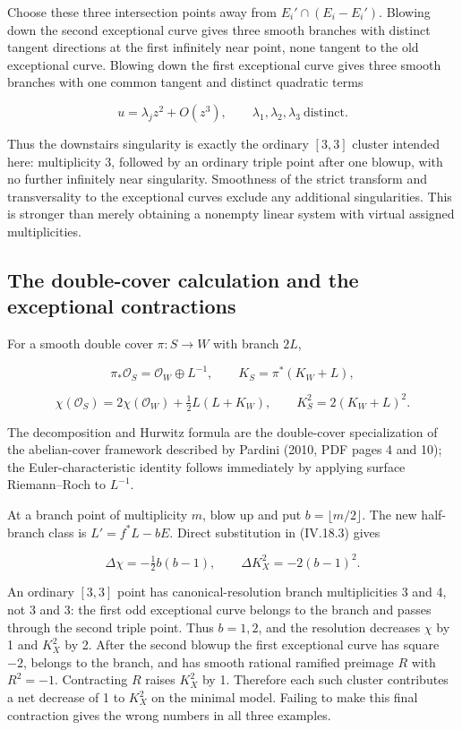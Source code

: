 Choose these three intersection points away from \(E_i'\cap(E_i-E_i')\). Blowing down the second exceptional curve gives three smooth branches with distinct tangent directions at the first infinitely near point, none tangent to the old exceptional curve. Blowing down the first exceptional curve gives three smooth branches with one common tangent and distinct quadratic terms

\[
u=\lambda_jz^2+O(z^3),\qquad \lambda_1,\lambda_2,\lambda_3\ \text{distinct}.
\]

Thus the downstairs singularity is exactly the ordinary \([3,3]\) cluster intended here: multiplicity 3, followed by an ordinary triple point after one blowup, with no further infinitely near singularity. Smoothness of the strict transform and transversality to the exceptional curves exclude any additional singularities. This is stronger than merely obtaining a nonempty linear system with virtual assigned multiplicities.

\subsection{The double-cover calculation and the exceptional contractions}

For a smooth double cover \(\pi:S\to W\) with branch \(2L\),

\[
\pi_*\mathcal O_S=\mathcal O_W\oplus L^{-1},\qquad
K_S=\pi^*(K_W+L),
\]

\[
\chi(\mathcal O_S)=2\chi(\mathcal O_W)+\tfrac12L(L+K_W),\qquad
K_S^2=2(K_W+L)^2.
\tag{IV.18.3}
\]

The decomposition and Hurwitz formula are the double-cover specialization of the abelian-cover framework described by Pardini (2010, PDF pages 4 and 10); the Euler-characteristic identity follows immediately by applying surface Riemann--Roch to \(L^{-1}\).

At a branch point of multiplicity \(m\), blow up and put \(b=\lfloor m/2\rfloor\). The new half-branch class is \(L'=f^*L-b E\). Direct substitution in (IV.18.3) gives

\[
\Delta\chi=-\tfrac12b(b-1),\qquad
\Delta K_X^2=-2(b-1)^2.
\tag{IV.18.4}
\]

An ordinary \([3,3]\) point has canonical-resolution branch multiplicities 3 and 4, not 3 and 3: the first odd exceptional curve belongs to the branch and passes through the second triple point. Thus \(b=1,2\), and the resolution decreases \(\chi\) by 1 and \(K_X^2\) by 2. After the second blowup the first exceptional curve has square \(-2\), belongs to the branch, and has smooth rational ramified preimage \(R\) with \(R^2=-1\). Contracting \(R\) raises \(K_X^2\) by 1. Therefore each such cluster contributes a net decrease of 1 to \(K_X^2\) on the minimal model. Failing to make this final contraction gives the wrong numbers in all three examples.

